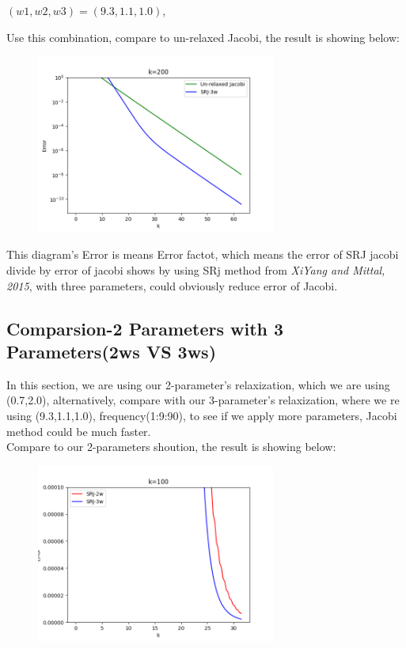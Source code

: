 \documentclass[12pt]{article}
\begin{document}
$(w1,w2,w3) = (9.3, 1.1 , 1.0)$,

Use this combination, compare to un-relaxed Jacobi, the result is showing below:



\begin{figure}[H]
    \centering
    \includegraphics[width=0.7\textwidth]{SRJ9.3_2.1_1.0a.png  }
    \label{SRJ9.3_1.1_2.0.png   }
\end{figure}


This diagram's Error is means Error factot,
which means the error of SRJ jacobi divide by error of jacobi
shows by using SRj method from \textit{XiYang and Mittal, 2015}, 
with three parameters, could obviously reduce error of Jacobi.




\subsection{Comparsion-2 Parameters with 3 Parameters(2ws VS 3ws)}

In this section, we are using our 2-parameter's relaxization, which we are using
(0.7,2.0), alternatively, compare with our 3-parameter's relaxization, where 
we re using (9.3,1.1,1.0), frequency(1:9:90), to see if we apply more parameters,
Jacobi method could be much faster.\\



Compare to our 2-parameters shoution, the result is showing below:


\begin{figure}[H]
    \centering
    \includegraphics[width=0.7\textwidth]{pcompare1.PNG   }
    
    
    \label{pcompare1.PNG    }
\end{figure}
\end{document}
